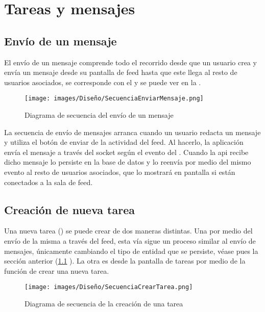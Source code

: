 \section{Tareas y mensajes}

\subsection{Envío de un mensaje}
\label{ssec:envio_mensaje}

El envío de un mensaje comprende todo el recorrido desde que un usuario crea y envía un mensaje desde su pantalla de feed hasta que este llega al resto de usuarios asociados, se corresponde con el  y se puede ver en la .

\begin{figure}[H]
    \centering
    \texttt{[image: images/Diseño/SecuenciaEnviarMensaje.png]}
    \caption{Diagrama de secuencia del envío de un mensaje}
    \label{dia:secuencia_envio_mensaje}
\end{figure}

La secuencia de envío de mensajes arranca cuando un usuario redacta un mensaje y utiliza el botón de enviar de la actividad del feed. Al hacerlo, la aplicación envía el mensaje a través del socket según el evento del . Cuando la \acrshort{api} recibe dicho mensaje lo persiste en la base de datos y lo reenvía por medio del mismo evento al resto de usuarios asociados, que lo mostrará en pantalla si están conectados a la sala de feed.

\subsection{Creación de nueva tarea}

Una nueva tarea () se puede crear de dos maneras distintas. Una por medio del envío de la misma a través del feed, esta vía sigue un proceso similar al envío de mensajes, únicamente cambiando el tipo de entidad que se persiste, véase pues la sección anterior (\ref{ssec:envio_mensaje} ). La otra es desde la pantalla de tareas por medio de la función de crear una nueva tarea.

\begin{figure}[H]
    \centering
    \texttt{[image: images/Diseño/SecuenciaCrearTarea.png]}
    \caption{Diagrama de secuencia de la creación de una tarea}
    \label{dia:secuencia_creacion_tarea}
\end{figure}

